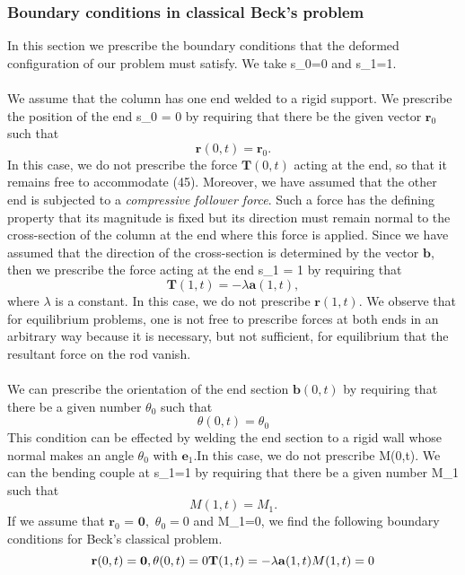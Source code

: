 
\subsubsection{Boundary conditions in classical Beck's problem}
In this section we prescribe the boundary conditions that the deformed configuration of our problem must satisfy. We take s_0=0 and s_1=1.\\\\
We assume that the column has one end welded to a rigid support. We prescribe the position of the end s_0 = 0 by requiring that there be the given vector $\mathbf{r}_0$ such that
\[ \mathbf{r}(0,t) = \mathbf{r}_0.\]
In this case, we do not prescribe the force $\mathbf{T}(0,t)$ acting at the end, so that it remains free to accommodate (45). Moreover, we have assumed that the other end is subjected to a \emph{compressive follower force}. Such a force has the defining property that its magnitude is fixed but its direction must remain normal to the cross-section of the column at the end where this force is applied. Since we have assumed that the direction of the cross-section is determined by the vector $\mathbf{b}$, then we prescribe the force acting at the end s_1 = 1 by requiring that 
\[ \mathbf{T}(1,t) = -\lambda \mathbf{a}(1,t), \]
where $\lambda$ is a constant. In this case, we do not prescribe $\mathbf{r}(1,t).$ We observe that for equilibrium problems, one is not free to prescribe forces at both ends in an arbitrary way because it is necessary, but not sufficient, for equilibrium that the resultant force on the rod vanish.
\\\\
We can prescribe the orientation of the end section $\mathbf{b}(0,t)$ by requiring that there be a given number $\theta_0$ such that
\[
\theta(0,t)=\theta_0
\]
This condition can be effected by welding the end section to a rigid wall whose normal makes an angle $\theta_0$ with $\mathbf{e}_1$.In this case, we do not prescribe M(0,t).
We can the bending couple at s_1=1 by requiring that there be a given number M_1 such that
\[ M(1,t) = M_1.\]
If we assume that $\mathbf{r}_0$ = $\mathbf{0},$ $\theta_0=0$ and M_1=0, we find the following boundary conditions for Beck's classical problem.
\[ 
\mathbf{r}(0,t) = \mathbf{0},\\
\theta(0,t) = 0\\
\mathbf{T}(1,t) = -\lambda \mathbf{a}(1,t)\\
M(1,t) = 0
\]

